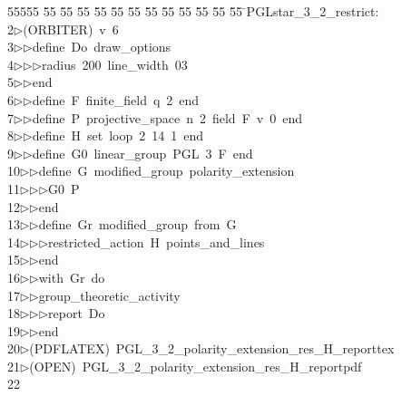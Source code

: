 %
%
\begin{tabbing}
55555 \= 55 \= 55 \= 55 \= 55 \= 55 \= 55 \= 55 \= 55 \= 55 \= 55 \= 55 \= 55 \= \>PGLstar\_3\_2\_restrict:\\[0pt]
2\>$\triangleright$\>(ORBITER)\ v\ 6\ \\[0pt]
3\>$\triangleright$\>$\triangleright$\>define\ Do\ draw\_options\ \\[0pt]
4\>$\triangleright$\>$\triangleright$\>$\triangleright$\>radius\ 200\ line\_width\ 03\ \\[0pt]
5\>$\triangleright$\>$\triangleright$\>end\ \\[0pt]
6\>$\triangleright$\>$\triangleright$\>define\ F\ finite\_field\ q\ 2\ end\ \\[0pt]
7\>$\triangleright$\>$\triangleright$\>define\ P\ projective\_space\ n\ 2\ field\ F\ v\ 0\ end\ \\[0pt]
8\>$\triangleright$\>$\triangleright$\>define\ H\ set\ loop\ 2\ 14\ 1\ end\ \\[0pt]
9\>$\triangleright$\>$\triangleright$\>define\ G0\ linear\_group\ PGL\ 3\ F\ end\ \\[0pt]
10\>$\triangleright$\>$\triangleright$\>define\ G\ modified\_group\ polarity\_extension\ \\[0pt]
11\>$\triangleright$\>$\triangleright$\>$\triangleright$\>G0\ P\ \\[0pt]
12\>$\triangleright$\>$\triangleright$\>end\ \\[0pt]
13\>$\triangleright$\>$\triangleright$\>define\ Gr\ modified\_group\ from\ G\ \\[0pt]
14\>$\triangleright$\>$\triangleright$\>$\triangleright$\>restricted\_action\ H\ points\_and\_lines\ \\[0pt]
15\>$\triangleright$\>$\triangleright$\>end\ \\[0pt]
16\>$\triangleright$\>$\triangleright$\>with\ Gr\ do\ \\[0pt]
17\>$\triangleright$\>$\triangleright$\>group\_theoretic\_activity\ \\[0pt]
18\>$\triangleright$\>$\triangleright$\>$\triangleright$\>report\ Do\ \\[0pt]
19\>$\triangleright$\>$\triangleright$\>end\\[0pt]
20\>$\triangleright$\>(PDFLATEX)\ PGL\_3\_2\_polarity\_extension\_res\_H\_reporttex\\[0pt]
21\>$\triangleright$\>(OPEN)\ PGL\_3\_2\_polarity\_extension\_res\_H\_reportpdf\\[0pt]
22\>\end{tabbing}
